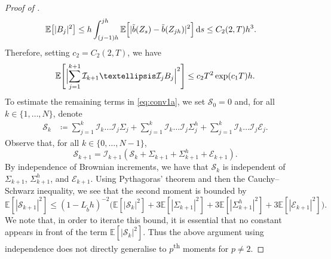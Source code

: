 \documentclass[onseside, final]{amsart}
\theoremstyle{definition}
\newcommand{\E}{\mathbb E}
\newcommand{\D}{\,\mathrm{d}}
\numberwithin{equation}{section}
\begin{document}
\begin{proof}[Proof of ]
			\begin{align}
				\E\bigl[|B_j|^2\bigr] & \leq h \int_{(j - 1)h}^{jh}\E\Bigl[|\tilde b(Z_s) - \tilde b(Z_{jh})|^2\Bigr] \D s \leq C_2(2, T) h^3. 
			\end{align}
			Therefore, setting $c_2 = C_2(2, T)$, we have
			\begin{equation}\label{eq:conv5}
				\begin{aligned}
					\E\Biggl[\Bigl|\sum_{j=1}^{k+1} \mathcal{I}_{k+1} \dots \mathcal{I}_{j} B_j\Bigr|^2\Biggr]
					\le
					c_2 T^2 \exp(c_1T) h.
				\end{aligned}
			\end{equation}
			To estimate the remaining terms in \eqref{eq:conv1a}, we set $\mathcal S_0=0$ and, for all $k\in\{1,\dots,N\}$, denote
			\begin{equation}\label{eq:conv6}
				\begin{aligned}
					\mathcal S_k &\coloneqq
					\sum_{j=1}^{k} \mathcal{I}_{k} \dots \mathcal{I}_{j} \Sigma_j
					+
					\sum_{j=1}^{k} \mathcal{I}_{k} \dots \mathcal{I}_{j} \Sigma^h_j
					+
					\sum_{j=1}^{k} \mathcal{I}_{k} \dots \mathcal{I}_{j} \mathcal E_j
					.
				\end{aligned}
			\end{equation}
			Observe that, for all $k\in\{0,\dots,N-1\}$,
			\begin{equation}\label{eq:conv7}
				\mathcal S_{k+1} = \mathcal{I}_{k+1} (\mathcal S_k + \Sigma_{k+1} + \Sigma^h_{k+1} + \mathcal E_{k+1}).
			\end{equation}
			By independence of Brownian increments, we have that $\mathcal S_k$ is independent of $\Sigma_{k+1}$, $\Sigma^h_{k+1}$, and $ \mathcal E_{k+1}$. Using Pythagoras' theorem and then the Cauchy--Schwarz inequality, we see that the second moment is bounded by
			\begin{equation}\label{eq:conv8}
				\mathbb{E} [|\mathcal S_{k+1}|^{2}]
				\le	
				(1-L_{\tilde b}h)^{-{2} }\bigl(\mathbb{E}[| \mathcal S_k|^{2}] + 3\mathbb{E}[|\Sigma_{k+1}|^{2}] + 3\mathbb{E}[|\Sigma^h_{k+1}|^{2}]+ 3\mathbb{E}[|\mathcal E_{k+1}|^{2}]\bigr).
			\end{equation}
			We note that, in order to iterate this bound, it is essential that no constant appears in front of the term $\mathbb{E}[| \mathcal S_k|^{2}]$. Thus the above argument using independence does not directly generalise to $p$\textsuperscript{th} moments for $p \neq 2$.
			

\end{proof}
\end{document}
